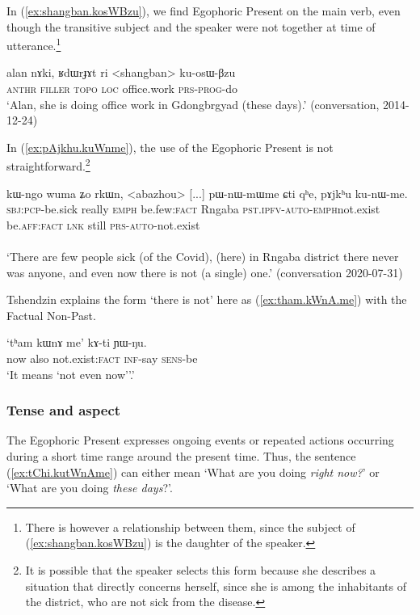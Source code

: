 In (\ref{ex:shangban.kosWBzu}), we find Egophoric Present on the main verb, even though the transitive subject and the speaker were not together at time of utterance.\footnote{There is however a relationship between them, since the subject of (\ref{ex:shangban.kosWBzu}) is the daughter of the speaker. }


\begin{exe}
	\ex \label{ex:shangban.kosWBzu}
	\gll alan nɤki, ʁdɯrɟɤt ri <shangban> ku-osɯ-βzu \\
	\textsc{anthr} \textsc{filler}  \textsc{topo} \textsc{loc} office.work \textsc{prs}-\textsc{prog}-do \\
	\glt `Alan, she is doing office work in Gdongbrgyad (these days).' (conversation, 2014-12-24)
\end{exe}

In (\ref{ex:pAjkhu.kuWnme}), the use of the Egophoric Present is not straightforward.\footnote{It is possible that the speaker selects this form because she describes a situation that directly concerns herself, since she is among the inhabitants of the district, who are not sick from the disease. }

\begin{exe}
	\ex \label{ex:pAjkhu.kuWnme}
	\gll kɯ-ngo wuma ʑo rkɯn, <abazhou> [...] pɯ-nɯ-mɯ\redp{}me ɕti qʰe, pɤjkʰu ku-nɯ-me. \\
	\textsc{sbj}:\textsc{pcp}-be.sick really \textsc{emph} be.few:\textsc{fact} Rngaba {  } \textsc{pst}.\textsc{ipfv}-\textsc{auto}-\textsc{emph}\redp{}not.exist be.\textsc{aff}:\textsc{fact} \textsc{lnk} still \textsc{prs}-\textsc{auto}-not.exist \\
	\\
	\glt `There are few people sick (of the Covid), (here) in Rngaba district there never was anyone, and even now there is not (a single) one.' 	(conversation 2020-07-31)
\end{exe}

Tshendzin explains the form  `there is not' here as (\ref{ex:tham.kWnA.me}) with the Factual Non-Past.
 
\begin{exe}
	\ex \label{ex:tham.kWnA.me}
	\gll `tʰam kɯnɤ me' kɤ-ti ɲɯ-ŋu. \\
	now also not.exist:\textsc{fact} \textsc{inf}-say \textsc{sens}-be \\
	\glt `It means `not even now''.'
\end{exe}


\subsubsection{Tense and aspect} \label{sec:egophoric.tense}
The Egophoric Present expresses ongoing events or repeated actions occurring during a short time range around the present time. Thus, the sentence (\ref{ex:tChi.kutWnAme}) can either mean `What are you doing \textit{right now?}' or `What are you doing \textit{these days}?'.


